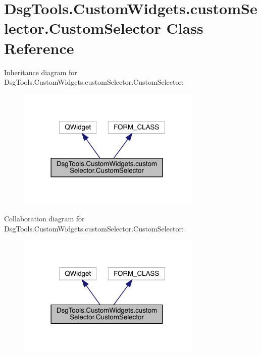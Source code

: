 \hypertarget{class_dsg_tools_1_1_custom_widgets_1_1custom_selector_1_1_custom_selector}{}\section{Dsg\+Tools.\+Custom\+Widgets.\+custom\+Selector.\+Custom\+Selector Class Reference}
\label{class_dsg_tools_1_1_custom_widgets_1_1custom_selector_1_1_custom_selector}


Inheritance diagram for Dsg\+Tools.\+Custom\+Widgets.\+custom\+Selector.\+Custom\+Selector\+:
\nopagebreak
\begin{figure}[H]
\begin{center}
\leavevmode
\includegraphics[width=249pt]{class_dsg_tools_1_1_custom_widgets_1_1custom_selector_1_1_custom_selector__inherit__graph}
\end{center}
\end{figure}


Collaboration diagram for Dsg\+Tools.\+Custom\+Widgets.\+custom\+Selector.\+Custom\+Selector\+:
\nopagebreak
\begin{figure}[H]
\begin{center}
\leavevmode
\includegraphics[width=249pt]{class_dsg_tools_1_1_custom_widgets_1_1custom_selector_1_1_custom_selector__coll__graph}
\end{center}
\end{figure}
